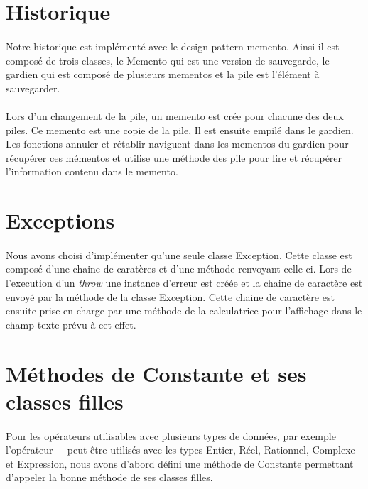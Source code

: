 \documentclass[a4paper,11pt]{report}
\begin{document}
	\section{Historique}
		\paragraph{}Notre historique est implémenté avec le design pattern memento. Ainsi il est composé de trois classes, le Memento qui est une version de sauvegarde, le gardien qui est composé de plusieurs mementos et la pile est l'élément à sauvegarder. 
		
		 \paragraph{}Lors d’un changement de la pile, un memento est crée pour chacune des deux piles. Ce memento est une copie de la pile, Il est ensuite empilé dans le gardien. Les fonctions annuler et rétablir naviguent dans les mementos du gardien pour récupérer ces mémentos et utilise une méthode des pile pour lire et récupérer l'information contenu dans le memento.
		 
	\section{Exceptions}
		\paragraph{}Nous avons choisi d'implémenter qu'une seule classe Exception. Cette classe est composé d'une chaine de caratères et d'une méthode renvoyant celle-ci. Lors de l'execution d'un \emph{throw} une instance d'erreur est créée et la chaine de caractère est envoyé par la méthode de la classe Exception. Cette chaine de caractère est ensuite prise en charge par une méthode de la calculatrice pour l'affichage dans le champ texte prévu à cet effet.
		
	\section{Méthodes de Constante et ses classes filles}
		\paragraph{}Pour les opérateurs utilisables avec plusieurs types de données, par exemple l'opérateur + peut-être utilisés avec les types Entier, Réel, Rationnel, Complexe et Expression, nous avons d'abord défini une méthode de Constante permettant d'appeler la bonne méthode de ses classes filles.
\end{document}
